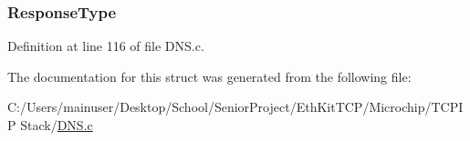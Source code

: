 \subsubsection[{Response\+Type}]{ Response\+Type}\label{struct_d_n_s___a_n_s_w_e_r___h_e_a_d_e_r_a5b116e50e6294cac035f57e585f8567a}


Definition at line 116 of file D\+N\+S.\+c.



The documentation for this struct was generated from the following file\+:\begin{DoxyCompactItemize}
\item 
C\+:/\+Users/mainuser/\+Desktop/\+School/\+Senior\+Project/\+Eth\+Kit\+T\+C\+P/\+Microchip/\+T\+C\+P\+I\+P Stack/\hyperlink{_d_n_s_8c}{D\+N\+S.\+c}\end{DoxyCompactItemize}

